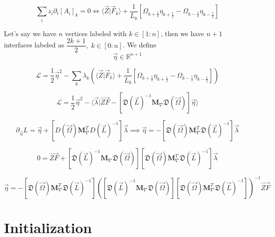 \documentclass[aps,12pt]{revtex4}
\newcommand{\half}{\frac{1}{2}}
\begin{document}
\begin{equation}
	\sum_i z_i \partial_t [A_i]_k = 0 \iff \langle \vec Z \vert \vec F_k \rangle
	 + \dfrac{1}{L_k}\left[\Omega_{k+\half} \eta_{k+\half} - \Omega_{k-\half} \eta_{k-\half}\right]
\end{equation}

Let's say we have $n$ vertices labeled with $k\in[1:n]$, then we have $n+1$ interfaces labeled as $\dfrac{2k+1}{2},\;k\in[0:n]$.
We define
\begin{equation}
	\vec \eta \in \mathbb R ^ {n+1}
\end{equation}

\begin{equation}
	\mathcal L = \dfrac{1}{2} \vec \eta ^2 - \sum_k \lambda_k \left(\langle \vec Z \vert \vec F_k \rangle
	 + \dfrac{1}{L_k}\left[\Omega_{k+\half} \eta_{k+\half} - \Omega_{k-\half} \eta_{k-\half}\right]\right)
\end{equation}

\begin{equation}
	\mathcal L = \dfrac{1}{2} \vec \eta ^2 - \langle \vec \lambda \vert \vec{ZF} - 
	\left[\mathfrak D (\vec L)^{-1} \bm M_\nabla \mathfrak D(\vec\Omega)\right] \vec \eta \rangle
\end{equation}

\begin{equation}
	\partial_{\vec \eta} L = \vec \eta +\left[ D(\vec\Omega) \bm M_\nabla ^T D (\vec L)^{-1} \right] \vec \lambda
	\implies \vec \eta = - \left[ \mathfrak D(\vec\Omega) \bm M_\nabla ^T \mathfrak D (\vec L)^{-1} \right] \vec \lambda
\end{equation}

\begin{equation}
	0 = \vec {ZF} + \left[\mathfrak D (\vec L)^{-1} \bm M_\nabla \mathfrak D(\vec\Omega)\right] 
	\left[ \mathfrak D(\vec\Omega) \bm M_\nabla ^T \mathfrak D (\vec L)^{-1} \right] \vec \lambda
\end{equation}

\begin{equation}
	\vec \eta = - \left[ \mathfrak D(\vec\Omega) \bm M_\nabla ^T \mathfrak D (\vec L)^{-1} \right] \left( \left[\mathfrak D (\vec L)^{-1} \bm M_\nabla \mathfrak D(\vec\Omega)\right] \left[ \mathfrak D(\vec\Omega) \bm M_\nabla ^T \mathfrak D (\vec L)^{-1} \right]\right) ^{-1} \vec{ZF}
\end{equation}


\section{Initialization}
\end{document}
